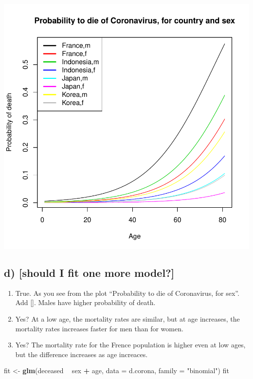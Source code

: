 \documentclass[
]{article}
\newenvironment{Shaded}{\begin{snugshade}}{\end{snugshade}}
\newcommand{\DataTypeTok}[1]{\textcolor[rgb]{0.13,0.29,0.53}{#1}}
\newcommand{\KeywordTok}[1]{\textcolor[rgb]{0.13,0.29,0.53}{\textbf{#1}}}
\newcommand{\NormalTok}[1]{#1}
\newcommand{\OperatorTok}[1]{\textcolor[rgb]{0.81,0.36,0.00}{\textbf{#1}}}
\newcommand{\StringTok}[1]{\textcolor[rgb]{0.31,0.60,0.02}{#1}}
\providecommand{\tightlist}{%
  \setlength{\itemsep}{0pt}\setlength{\parskip}{0pt}}
\begin{document}
\includegraphics{Eksamensbesvarelse_files/figure-latex/unnamed-chunk-11-1.pdf}

\hypertarget{d-should-i-fit-one-more-model}{%
\subsection{d) {[}should I fit one more
model?{]}}\label{d-should-i-fit-one-more-model}}

\begin{enumerate}
\def\labelenumi{\roman{enumi})}
\tightlist
\item
  True. As you see from the plot ``Probability to die of Coronavirus,
  for sex''. Add \ref{}. Males have higher probability of death.
\item
  Yes? At a low age, the mortality rates are similar, but at age
  increases, the mortality rates increases faster for men than for
  women.
\item
  Yes? The mortality rate for the Frence population is higher even at
  low ages, but the difference increases as age increaces.
\end{enumerate}

\begin{Shaded}
\begin{Highlighting}[]
\NormalTok{fit <-}\StringTok{ }\KeywordTok{glm}\NormalTok{(deceased }\OperatorTok{~}\StringTok{ }\NormalTok{sex }\OperatorTok{+}\StringTok{ }\NormalTok{age, }\DataTypeTok{data =}\NormalTok{ d.corona, }\DataTypeTok{family =} \StringTok{"binomial"}\NormalTok{)}
\NormalTok{fit}
\end{Highlighting}
\end{Shaded}
\end{document}
